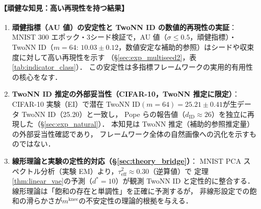 \documentclass[11pt,a4paper]{jsarticle}
\newcommand{\mknee}{m^{\mathrm{knee}}}
\begin{document}
\paragraph{【頑健な知見：高い再現性を持つ結果】}
\begin{enumerate}
  \item \textbf{頑健指標（AU 値）の安定性と TwoNN ID の数値的再現性の実証}：
        MNIST 300 エポック・3シード検証で，AU 値（$\sigma \leq 0.5$，頑健指標）・
        TwoNN ID（$m=64$: $10.03 \pm 0.12$，数値安定な補助的参照）はシードや収束度に対して高い再現性を示す
        （§\ref{sec:exp_multiseed2}，表\ref{tab:indicator_class}）．
        この安定性は多指標フレームワークの実用的有用性の核心をなす．
  \item \textbf{TwoNN ID 推定の外部妥当性（CIFAR-10，TwoNN 推定に限定）}：
        CIFAR-10 実験（EI）で潜在 TwoNN ID$(m=64)=25.21\pm0.41$が生データ TwoNN ID（25.20）と一致し，
        Pope ら\cite{pope2021intrinsic}の報告値（$d_\mathrm{ID} \approx 26$）を独立に再現した（§\ref{sec:exp_natural}）．
        本知見は TwoNN 推定（補助的参照推定量）の外部妥当性確認であり，
        フレームワーク全体の自然画像への汎化を示すものではない．
  \item \textbf{線形理論と実験の定性的対応（§\ref{sec:theory_bridge}）}：
        MNIST PCA スペクトル分析（実験 EM）より，$\tau^2_\mathrm{eff} \approx 0.30$（逆算値）で
        定理\ref{thm:linear_vae}の予測（$d^*=10$）が観測 TwoNN ID と定性的に整合する．
        線形理論は「飽和の存在と単調性」を正確に予測するが，
        非線形設定での飽和の滑らかさが$\mknee$の不安定性の理論的根拠を与える．
\end{enumerate}
\end{document}
